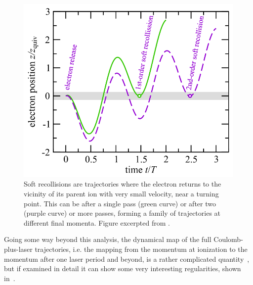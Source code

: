 \begin{figure}[t]
\centering
\includegraphics[scale=1]{6-LES/Figures/figure6J.png}
  \caption[
  Soft recollisions as originally presented by A. Kästner et al.
  ]{
  Soft recollisions are trajectories where the electron returns to the vicinity of its parent ion with very small velocity, near a turning point. This can be after a single pass (green curve) or after two (purple curve) or more passes, forming a family of trajectories at different final momenta.
  Figure excerpted from .
  }
\label{f6-rost-soft-recollisions}
\end{figure}






Going some way beyond this analysis, the dynamical map of the full Coulomb-plus-laser trajectories, i.e. the mapping from the momentum at ionization to the momentum after one laser period and beyond, is a rather complicated quantity~\cite[cf.][Fig.~7]{Becker_rescattering}, but if examined in detail it can show some very interesting regularities, shown in~.



